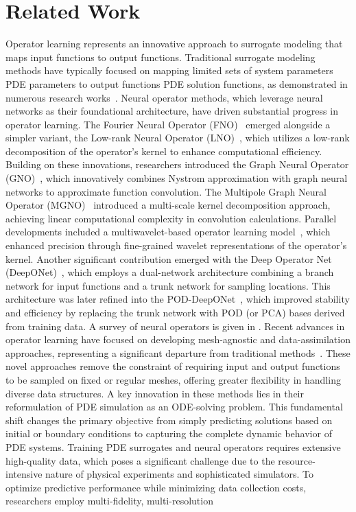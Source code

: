 \section{Related Work}
Operator learning represents an innovative approach to surrogate modeling that maps input functions to output functions. Traditional surrogate modeling methods have typically focused on mapping limited sets of system parameters \eg PDE parameters to output functions \eg PDE solution functions, as demonstrated in numerous research works~\citep{higdon2008computer,zhe2019scalable,li2021scalable,wang2021multi,xing2021residual,xing2021deep,li2022infinite}. Neural operator methods, which leverage neural networks as their foundational architecture, have driven substantial progress in operator learning. The Fourier Neural Operator (FNO)~\citep{li2020fourier} emerged alongside a simpler variant, the Low-rank Neural Operator (LNO)~\citep{kovachki2023neural}, which utilizes a low-rank decomposition of the operator's kernel to enhance computational efficiency. Building on these innovations, researchers introduced the Graph Neural Operator (GNO)~\citep{li2020neural}, which innovatively combines Nystrom approximation with graph neural networks to approximate function convolution. The Multipole Graph Neural Operator (MGNO)~\citep{li2020multipole} introduced a multi-scale kernel decomposition approach, achieving linear computational complexity in convolution calculations. Parallel developments included a multiwavelet-based operator learning model~\citep{gupta2021multiwavelet}, which enhanced precision through fine-grained wavelet representations of the operator's kernel. Another significant contribution emerged with the Deep Operator Net (DeepONet)~\citep{lu2021learning}, which employs a dual-network architecture combining a branch network for input functions and a trunk network for sampling locations. This architecture was later refined into the POD-DeepONet~\citep{lu2022comprehensive}, which improved stability and efficiency by replacing the trunk network with POD (or PCA) bases derived from training data. A survey of neural operators is given in \citep{kovachki2023neural}. Recent advances in operator learning have focused on developing mesh-agnostic and data-assimilation approaches, representing a significant departure from traditional methods~\citep{yin2022continuous, chen2022crom, pilva2022learning, boussif2022magnet, esmaeilzadeh2020meshfreeflownet}. These novel approaches remove the constraint of requiring input and output functions to be sampled on fixed or regular meshes, offering greater flexibility in handling diverse data structures. A key innovation in these methods lies in their reformulation of PDE simulation as an ODE-solving problem. This fundamental shift changes the primary objective from simply predicting solutions based on initial or boundary conditions to capturing the complete dynamic behavior of PDE systems. Training PDE surrogates and neural operators requires extensive high-quality data, which poses a significant challenge due to the resource-intensive nature of physical experiments and sophisticated simulators. To optimize predictive performance while minimizing data collection costs, researchers employ multi-fidelity, multi-resolution 